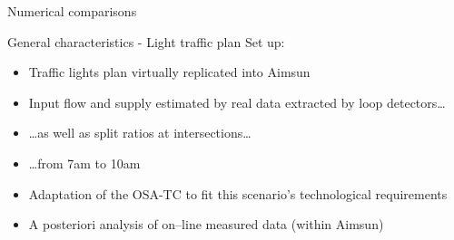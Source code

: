 \begin{frame}{Numerical comparisons}
    \begin{exampleblock}{General characteristics - Light traffic plan}
    Set up:
    \begin{itemize}
    \item Traffic lights plan virtually replicated into Aimsun
    \item Input flow and supply estimated by real data extracted by loop detectors\dots
    \item \dots as well as split ratios at intersections\dots
    \item \dots from 7am to 10am
    \item Adaptation of the OSA-TC to fit this scenario's technological requirements
    \item A posteriori analysis of on--line measured data (within Aimsun)
    \end{itemize}
    \end{exampleblock}
\end{frame}